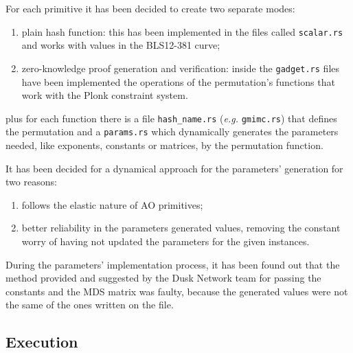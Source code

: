 \documentclass[12pt, a4paper]{report}
\begin{document}
For each primitive it has been decided to create two separate modes:
\begin{enumerate}
  \item plain hash function: this has been implemented in the files called \texttt{scalar.rs} and works with values in the BLS12-381 curve;
  \item zero-knowledge proof generation and verification: inside the \texttt{gadget.rs} files have been implemented the operations of the permutation's functions that work with the \textsf{Plonk} constraint system.
\end{enumerate}
plus for each function there is a file \texttt{hash\_name.rs} (\textsl{e.g.} \texttt{gmimc.rs}) that defines the permutation and a \texttt{params.rs} which dynamically generates the parameters needed, like exponents, constants or matrices, by the permutation function.

It has been decided for a dynamical approach for the parameters' generation for two reasons:
\begin{enumerate}
  \item follows the elastic nature of AO primitives;
  \item better reliability in the parameters generated values, removing the constant worry of having not updated the parameters for the given instances.
\end{enumerate}

\begin{note}
  During the parameters' implementation process, it has been found out that the method provided and suggested by the Dusk Network team for passing the constants and the MDS matrix was faulty, because the generated values were not the same of the ones written on the file.
\end{note}

\subsection{Execution}\label{subsec:execution}
\end{document}
